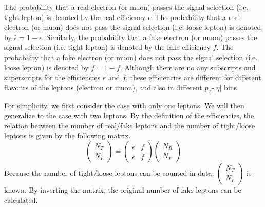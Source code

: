 The probability that a real electron (or muon) passes the signal selection (i.e. tight lepton) is denoted by the real efficiency $\epsilon$.
The probability that a real electron (or muon) does not pass the signal selection (i.e. loose lepton) is denoted by $\bar{\epsilon} = 1 - \epsilon$.
Similarly, the probability that a fake electron (or muon) passes the signal selection (i.e. tight lepton) is denoted by the fake efficiency $f$.
The probability that a fake electron (or muon) does not pass the signal selection (i.e. loose lepton) is denoted by $\bar{f} = 1 - f$.
Although there are no any subscripts and superscripts for the efficiencies $e$ and $f$, these efficiencies are different for different flavours of the leptons (electron or muon), and also in different $p_T$-$|\eta|$ bins.

For simplicity, we first consider the case with only one leptons. We will then generalize to the case with two leptons.
By the definition of the efficiencies, the relation between the number of real/fake leptons and the number of tight/loose leptons is given by the following matrix.
\begin{equation}
\left( \begin{array}{c}
N_T \\
N_L
\end{array} \right)
=
\left( \begin{array}{cc}
\epsilon & f \\
\bar{\epsilon} & \bar{f}
\end{array} \right)
\left( \begin{array}{c}
N_R \\
N_F
\end{array} \right)
\label{equ:fake_eff_def}
\end{equation}
Because the number of tight/loose leptons can be counted in data, $\left( \begin{array}{c}
N_T \\
N_L
\end{array} \right)$ is known.
By inverting the matrix, the original number of fake leptons can be calculated.
